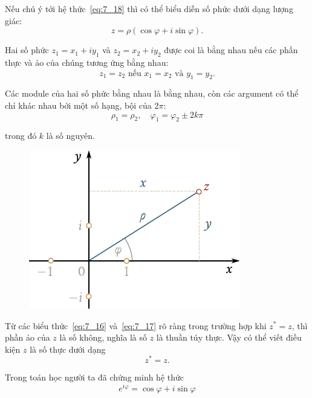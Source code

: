 Nếu chú ý tới hệ thức~\eqref{eq:7_18} thì có thể biểu diễn số phức dưới dạng lượng giác:
\begin{equation}\label{eq:7_20}
	z = \rho(\cos\varphi + i\sin\varphi).
\end{equation}

Hai số phức $z_1=x_1+iy_1$ và $z_2=x_2+iy_2$ được coi là bằng nhau nếu các phần thực và ảo của chúng tương ứng bằng nhau:
\begin{equation}\label{eq:7_21}
	z_1 = z_2\,\, \text{nếu}\,\, x_1 = x_2\,\, \text{và}\,\, y_1 = y_2.
\end{equation}

\noindent
Các module của hai số phức bằng nhau là bằng nhau, còn các argument có thể chỉ khác nhau bởi một số hạng, bội của $2\pi$:
\begin{equation}\label{eq:7_22}
	\rho_1 = \rho_2,\quad \varphi_1 = \varphi_2\pm 2k\pi
\end{equation}

\noindent
trong đó $k$ là số nguyên.

\begin{figure}[!htb]
	\begin{center}
		\includegraphics[scale=0.95]{figures/ch_07/fig_7_3.pdf}
		\caption[]{}
		\label{fig:7_3}
	\end{center}
\end{figure}

Từ các biểu thức~\eqref{eq:7_16} và~\eqref{eq:7_17} rõ ràng trong trường hợp khi $z^*=z$, thì phần ảo của $z$ là số không, nghĩa là số $z$ là thuần túy thực. Vậy có thể viết điều kiện $z$ là số thực dưới dạng
\begin{equation}\label{eq:7_23}
	z^* = z.
\end{equation}

Trong toán học người ta đã chứng minh hệ thức
\begin{equation}\label{eq:7_24}
	e^{i\varphi} = \cos\varphi + i\sin\varphi
\end{equation}

